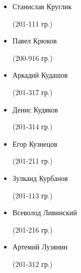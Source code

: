\begin{multicols}{2}
\begin{small}
\begin{itemize}[leftmargin=0.5em]
	\item[] Станислав Круглик\begin{tiny} (201-111 гр.)\end{tiny}
	\item[] Павел Крюков\begin{tiny} (200-916 гр.)\end{tiny} %
	\item[] Аркадий Кудашов\begin{tiny} (201-317 гр.)\end{tiny} %
	\item[] Денис Кудяков\begin{tiny} (201-314 гр.)\end{tiny} %
	\item[] Егор Кузнецов\begin{tiny} (201-211 гр.)\end{tiny}
	\item[] Зулкаид Курбанов\begin{tiny} (201-113 гр.)\end{tiny}

	\item[] Всеволод Ливинский\begin{tiny} (201-216 гр.)\end{tiny} %
	\item[] Артемий Лузянин\begin{tiny} (201-312 гр.)\end{tiny} %


\end{itemize}
\end{small}
\end{multicols}

